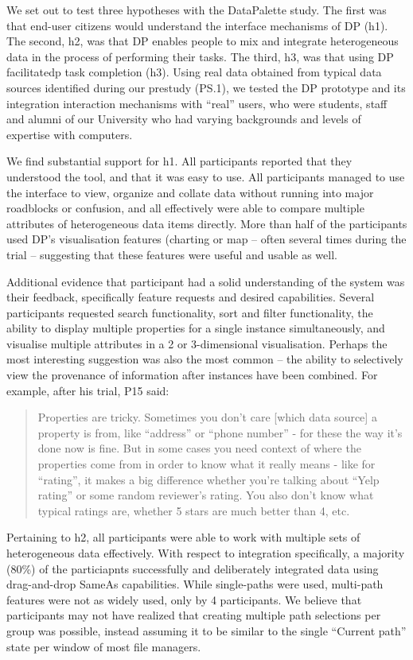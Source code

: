 \documentclass{sigchi}
\begin{document}
We set out to test three hypotheses with the DataPalette study. The first was that end-user citizens would understand the interface mechanisms of DP (h1).  The second, h2, was that DP enables people to mix and integrate heterogeneous data in the process of performing their tasks.  The third, h3, was that using DP facilitatedp task completion (h3).  Using real data obtained from typical data sources identified during our prestudy (PS.1), we tested the DP prototype and its integration interaction mechanisms with ``real'' users, who were students, staff and alumni of our University who had varying backgrounds and levels of expertise with computers.

We find substantial support for h1. All participants reported that they understood the tool, and that it was easy to use.   All participants managed to use the interface to view, organize and collate data without running into major roadblocks or confusion, and all effectively were able to compare multiple attributes of heterogeneous data items directly.  More than half of the participants used DP's visualisation features (charting or map -- often several times during the trial -- suggesting that these features were useful and usable as well.  

Additional evidence that participant had a solid understanding of the system was their feedback, specifically feature requests and desired capabilities.  Several participants requested search functionality, sort and filter functionality, the ability to display multiple properties for a single instance simultaneously, and visualise multiple attributes in a 2 or 3-dimensional visualisation.  Perhaps the most interesting suggestion was also the most common -- the ability to selectively view the provenance of information after instances have been combined.  For example, after his trial, P15 said:

\begin{quote}
Properties are tricky. Sometimes you don’t care [which data source] a property is from, like ``address'' or ``phone number'' - for these the way it’s done now is fine. But in some cases you need context of where the properties come from in order to know what it really means - like for ``rating'', it makes a big difference whether you’re talking about ``Yelp rating'' or some random reviewer's rating.  You also don’t know what typical ratings are, whether 5 stars are much better than 4, etc.
\end{quote}

Pertaining to h2, all participants were able to work with multiple sets of heterogeneous data effectively.  With respect to integration specifically, a majority (80\%) of the particiapnts successfully and deliberately integrated data using drag-and-drop SameAs capabilities.  While single-paths were used, multi-path features were not as widely used, only by 4 participants. We believe that participants may not have realized that creating multiple path selections per group was possible, instead assuming it to be similar to the single ``Current path'' state per window of most file managers. 
\end{document}
